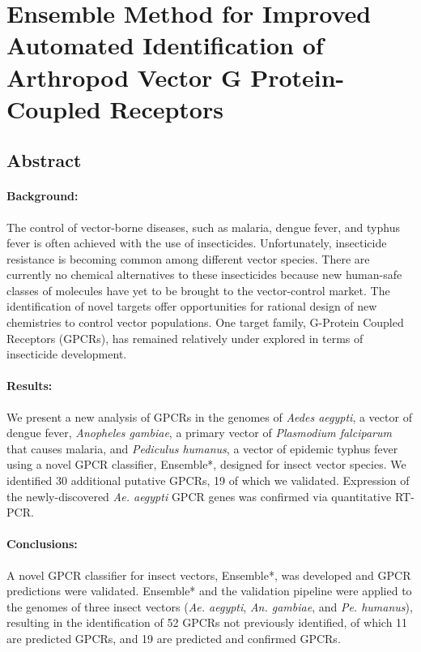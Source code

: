 \section{Ensemble Method for Improved Automated Identification of Arthropod Vector G Protein-Coupled Receptors}

\subsection{Abstract}

\paragraph*{Background:}
The control of vector-borne diseases, such as malaria, dengue fever, and typhus fever is often achieved with the use of insecticides. Unfortunately, insecticide resistance is becoming common among different vector species. There are currently no chemical alternatives to these insecticides because new human-safe classes of molecules have yet to be brought to the vector-control market.  The identification of novel targets offer opportunities for rational design of new chemistries to control vector populations. One target family, G-Protein Coupled Receptors (GPCRs), has remained relatively under explored in terms of insecticide development.

\paragraph*{Results:}
We present a new analysis of GPCRs in the genomes of \emph{Aedes aegypti}, a vector of dengue fever, \emph{Anopheles gambiae}, a primary vector of \emph{Plasmodium falciparum} that causes malaria, and \emph{Pediculus humanus}, a vector of epidemic typhus fever using a novel GPCR classifier, Ensemble*, designed for insect vector species.  We identified 30 additional putative GPCRs, 19 of which we validated.  Expression of the newly-discovered \emph{Ae. aegypti} GPCR genes was confirmed via quantitative RT-PCR.

\paragraph*{Conclusions:}
A novel GPCR classifier for insect vectors, Ensemble*, was developed and GPCR predictions were validated. Ensemble* and the validation pipeline were applied to the genomes of three insect vectors (\emph{Ae. aegypti}, \emph{An. gambiae}, and \emph{Pe. humanus}), resulting in the identification of 52 GPCRs not previously identified, of which 11 are predicted GPCRs, and 19 are predicted and confirmed GPCRs.

